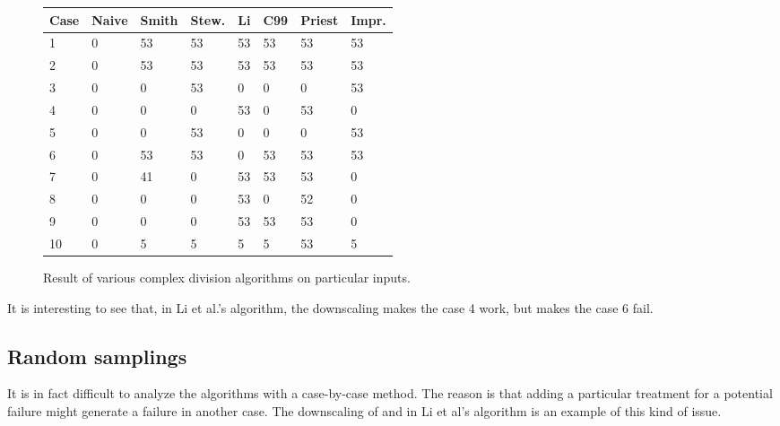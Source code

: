 \documentclass{paper}
\begin{document}
\begin{figure}
\caption{Result of various complex division algorithms on particular inputs.}
\label{fig-compdiv-diffcases}
\begin{center}
\begin{tabular}{l|lllllll@{}}
\bf{Case} & \bf{Naive} & \bf{Smith} & \bf{Stew.} & \bf{Li}   & \bf{C99}  & \bf{Priest} & \bf{Impr.} \\
\hline
1  &   0  &   53  &  53  &  53  &  53  &  53  &   53   \\
2  &   0  &   53  &  53  &  53  &  53  &  53  &   53   \\  
3  &   0  &   0   &  53  &  0   &  0   &  0   &   53   \\    
4  &   0  &   0   &  0   &  53  &  0   &  53  &   0    \\    
5  &   0  &   0   &  53  &  0   &  0   &  0   &   53   \\    
6  &   0  &   53  &  53  &  0   &  53  &  53  &   53   \\    
7  &   0  &   41  &  0   &  53  &  53  &  53  &   0    \\    
8  &   0  &   0   &  0   &  53  &  0   &  52  &   0    \\    
9  &   0  &   0   &  0   &  53  &  53  &  53  &   0    \\    
10 &   0  &   5   &  5   &  5   &  5   &  53  &   5    \\    
\end{tabular}
\end{center}
\end{figure}

It is interesting to see that, in Li et al.'s algorithm, the downscaling 
makes the case 4 work, but makes the case 6 fail. 



\subsection{Random samplings}
\label{section-randomsamplings}

It is in fact difficult to analyze the algorithms with a case-by-case method. 
The reason is that adding a particular treatment for a potential 
failure might generate a failure in another case. 
The downscaling of  and  in Li et al's algorithm is an example 
of this kind of issue. 
\end{document}

